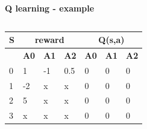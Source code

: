 \documentclass[xcolor=dvipsnames]{beamer}
\begin{document}
\begin{frame}{\bf Q learning - example}
\begin{columns}
\begin{column}{0.5\textwidth}
    {\footnotesize
        \begin{table}[]
        \begin{tabular}{|l|l|l|l|l|l|l|}
        \hline
        \textbf{S} & \multicolumn{3}{c|}{\textbf{reward}}   & \multicolumn{3}{c|}{\textbf{Q(s,a)}} \\ \hline
        \textbf{}  & \textbf{A0}       & \textbf{A1}        & \textbf{A2}       & \textbf{A0}       & \textbf{A1}      & \textbf{A2} \\ \hline
        0          & 1                 & -1                 & 0.5               & 0                 & 0                & 0 \\ \hline
        1          & -2                & x                  & x                 & 0                 & 0                & 0 \\ \hline
        2          & 5                 & x                  & x                 & 0                 & 0                & 0  \\ \hline
        3          & x                 & x                  & x                 & 0                 & 0                & 0 \\ \hline
        \end{tabular}
        \end{table}
    }
    \end{column}
\end{columns}

\end{frame}
\end{document}
